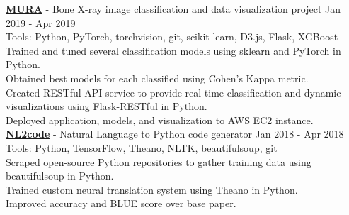 \documentclass[a4paper]{article}
\newcommand{\mybullet}{
	\indent 
  \textbullet \hspace*{2mm}
}
\begin{document}
      \noindent
      \textbf{\href{http://ec2-3-212-216-62.compute-1.amazonaws.com/}{MURA}} - Bone X-ray image 
      classification and data visualization project \hfill Jan 2019 - Apr 2019 \\
      Tools: Python, PyTorch, torchvision, git, scikit-learn, D3.js, Flask, XGBoost \\
      \mybullet Trained and tuned several classification models using sklearn and PyTorch in Python. \\
      \mybullet Obtained best models for each classified using Cohen's Kappa metric. \\
      \mybullet Created RESTful API service to provide real-time classification and dynamic visualizations
      using Flask-RESTful in Python. \\
      \mybullet Deployed application, models, and visualization to AWS EC2 instance. \\

			\noindent
      \textbf{\href{https://github.com/nischalchand/NL2code}{NL2code}} - Natural Language to 
      Python code generator \hfill Jan 2018 - Apr 2018 \\
      Tools: Python, TensorFlow, Theano, NLTK, beautifulsoup, git \\
      \mybullet Scraped open-source Python repositories to gather training data 
      using beautifulsoup in Python. \\
      \mybullet Trained custom neural translation system using Theano in Python. \\
      \mybullet Improved accuracy and BLUE score over base paper. \\
\end{document}

